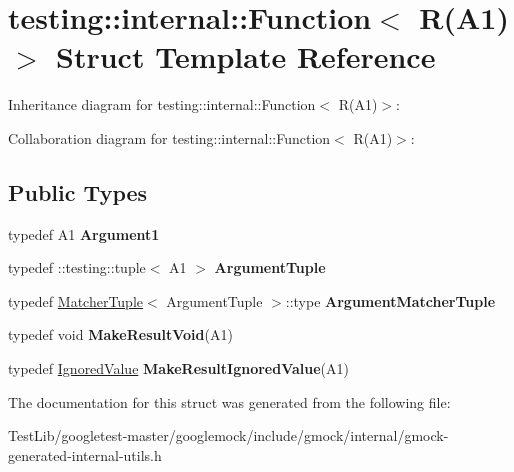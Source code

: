\hypertarget{structtesting_1_1internal_1_1Function_3_01R_07A1_08_4}{}\section{testing\+:\+:internal\+:\+:Function$<$ R(A1)$>$ Struct Template Reference}
\label{structtesting_1_1internal_1_1Function_3_01R_07A1_08_4}


Inheritance diagram for testing\+:\+:internal\+:\+:Function$<$ R(A1)$>$\+:


Collaboration diagram for testing\+:\+:internal\+:\+:Function$<$ R(A1)$>$\+:
\subsection*{Public Types}
\begin{DoxyCompactItemize}
\item 
\mbox{\label{structtesting_1_1internal_1_1Function_3_01R_07A1_08_4_aca36c8586218fd015cc4736dc8d4c14f}} 
typedef A1 {\bfseries Argument1}
\item 
\mbox{\label{structtesting_1_1internal_1_1Function_3_01R_07A1_08_4_afd48881a58d72658e547a170fb0f2087}} 
typedef \+::testing\+::tuple$<$ A1 $>$ {\bfseries Argument\+Tuple}
\item 
\mbox{\label{structtesting_1_1internal_1_1Function_3_01R_07A1_08_4_a0e35671ae43c3d3310893e1d6d895d06}} 
typedef \hyperlink{structtesting_1_1internal_1_1MatcherTuple}{Matcher\+Tuple}$<$ Argument\+Tuple $>$\+::type {\bfseries Argument\+Matcher\+Tuple}
\item 
\mbox{\label{structtesting_1_1internal_1_1Function_3_01R_07A1_08_4_aab10495172953eb51fc3940c4c1e890a}} 
typedef void {\bfseries Make\+Result\+Void}(A1)
\item 
\mbox{\label{structtesting_1_1internal_1_1Function_3_01R_07A1_08_4_a8fa56b9e05cb029ec7c8415ee352f865}} 
typedef \hyperlink{classtesting_1_1internal_1_1IgnoredValue}{Ignored\+Value} {\bfseries Make\+Result\+Ignored\+Value}(A1)
\end{DoxyCompactItemize}


The documentation for this struct was generated from the following file\+:\begin{DoxyCompactItemize}
\item 
Test\+Lib/googletest-\/master/googlemock/include/gmock/internal/gmock-\/generated-\/internal-\/utils.\+h\end{DoxyCompactItemize}
